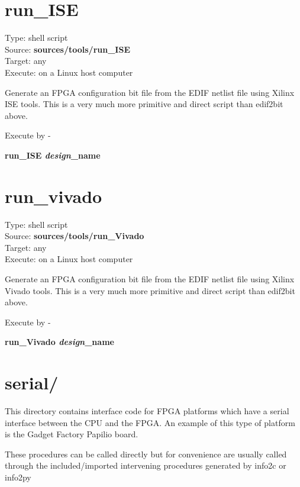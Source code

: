                 
    \section{run\_ISE}
    
        Type: shell script\\        
        Source: {\bf sources/tools/run\_ISE}\\
        Target: any\\
        Execute: on a Linux host computer
    
        Generate an FPGA configuration bit file
        from the EDIF netlist file using Xilinx ISE tools. This is
        a very much more primitive and direct script than edif2bit
        above.
        
        Execute by -
        
        {\bf run\_ISE {\em design}\_name}

    \section{run\_vivado}
    
        Type: shell script\\        
        Source: {\bf sources/tools/run\_Vivado}\\
        Target: any\\
        Execute: on a Linux host computer
    
        Generate an FPGA configuration bit
        file from the EDIF netlist file using Xilinx Vivado
        tools. This is a very much more primitive and direct
        script than edif2bit above.
        
        Execute by -
        
        {\bf run\_Vivado {\em design}\_name}

    \section{serial/}
    
        This directory contains interface code for FPGA platforms which have
        a serial interface between the CPU and the FPGA. An example of this
        type of platform is the Gadget Factory Papilio board.
        
        These procedures can be called directly but for convenience are usually
        called through the included/imported intervening procedures generated by
        info2c or info2py
                
